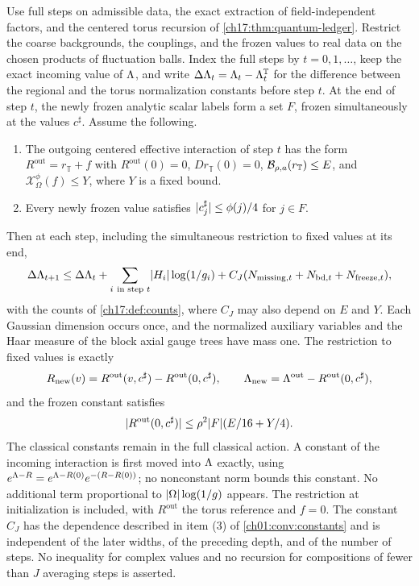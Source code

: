 \begin{theorem}\label{ch17:thm:real-scalar-ledger}
Use full steps on admissible data, the exact extraction of field-independent factors, and the centered torus recursion of \cref{ch17:thm:quantum-ledger}. Restrict the coarse backgrounds, the couplings, and the frozen values to real data on the chosen products of fluctuation balls. Index the full steps by $t=0,1,\ldots$, keep the exact incoming value of $\Lambda$, and write $\Delta\Lambda_t=\Lambda_t-\Lambda_t^{\mathbb T}$ for the difference between the regional and the torus normalization constants before step $t$. At the end of step $t$, the newly frozen analytic scalar labels form a set $F$, frozen simultaneously at the values $c^\sharp$. Assume the following.
\begin{enumerate}
\item[(a)] The outgoing centered effective interaction of step $t$ has the form $R^{\mathrm{out}}=r_{\mathbb T}+f$ with $R^{\mathrm{out}}(0)=0$, $Dr_{\mathbb T}(0)=0$, $\mathcal B_{\rho,a}(r_{\mathbb T})\le E$, and $\mathcal X^\phi_\Omega(f)\le Y$, where $Y$ is a fixed bound.
\item[(b)] Every newly frozen value satisfies $\lvert c^\sharp_j\rvert\le\phi(j)/4$ for $j\in F$.
\end{enumerate}
Then at each step, including the simultaneous restriction to fixed values at its end,
\begin{equation}\label{ch17:eq:real-ledger-increment}
 \Delta\Lambda_{t+1}\le\Delta\Lambda_t+\sum_{i\ \text{in step }t}\lvert H_i\rvert\log(1/g_i)+C_J(N_{\mathrm{missing},t}+N_{\mathrm{bd},t}+N_{\mathrm{freeze},t}),
\end{equation}
with the counts of \cref{ch17:def:counts}, where $C_J$ may also depend on $E$ and $Y$. Each Gaussian dimension occurs once, and the normalized auxiliary variables and the Haar measure of the block axial gauge trees have mass one. The restriction to fixed values is exactly
\[
 R_{\mathrm{new}}(v)=R^{\mathrm{out}}(v,c^\sharp)-R^{\mathrm{out}}(0,c^\sharp),\qquad\Lambda_{\mathrm{new}}=\Lambda^{\mathrm{out}}-R^{\mathrm{out}}(0,c^\sharp),
\]
and the frozen constant satisfies
\begin{equation}\label{ch17:eq:freezing-charge}
 \lvert R^{\mathrm{out}}(0,c^\sharp)\rvert\le\rho^2\lvert F\rvert(E/16+Y/4).
\end{equation}
The classical constants remain in the full classical action. A constant of the incoming interaction is first moved into $\Lambda$ exactly, using $e^{\Lambda-R}=e^{\Lambda-R(0)}e^{-(R-R(0))}$; no nonconstant norm bounds this constant. No additional term proportional to $\lvert \Omega\rvert\log(1/g)$ appears. The restriction at initialization is included, with $R^{\mathrm{out}}$ the torus reference and $f=0$. The constant $C_J$ has the dependence described in item (3) of \cref{ch01:conv:constants} and is independent of the later widths, of the preceding depth, and of the number of steps. No inequality for complex values and no recursion for compositions of fewer than $J$ averaging steps is asserted.
\end{theorem}

